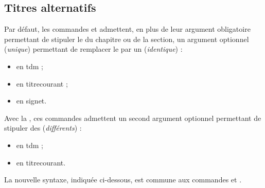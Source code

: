 \subsection{Titres alternatifs}
\label{sec-intit-altern}
%
%

Par défaut, les commandes  et 
admettent, en plus de leur argument obligatoire permettant de stipuler le
 du chapitre ou de la section, un argument optionnel (\emph{unique})
permettant de remplacer le  par un 
(\emph{identique}) :
\begin{itemize}
\item en \gls{tdm} ;
\item en \gls{titrecourant} ;
\item en signet.
\end{itemize}

Avec la \yatCl{}, ces commandes admettent un second argument optionnel
permettant de stipuler des  (\emph{différents}) :
\begin{itemize}
\item en \gls{tdm}\signet{} ;
\item en \gls{titrecourant}.
\end{itemize}
La nouvelle syntaxe, indiquée ci-dessous, est commune aux commandes
 et .


